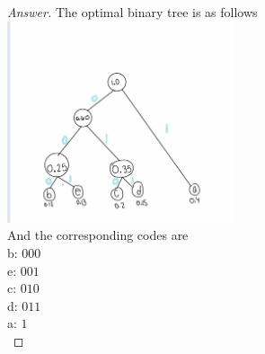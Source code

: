 \documentclass[11pt]{article}
\theoremstyle{definition}
\theoremstyle{definition}
\theoremstyle{definition}
\begin{document}
\begin{proof}[Answer]
The optimal binary tree is as follows \\

\includegraphics[width=0.5\textwidth]{problem9} \\

And the corresponding codes are \\
b: $000$\\
e: $001$\\
c: $010$\\
d: $011$\\
a: $1$\\

\end{proof}



\end{document}

